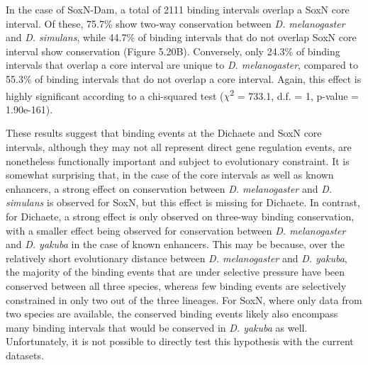 In the case of SoxN-Dam, a total of 2111 binding intervals overlap a SoxN core interval. Of these, 75.7\% show two-way conservation between \emph{D. melanogaster} and \emph{D. simulans}, while 44.7\% of binding intervals that do not overlap SoxN core interval show conservation (Figure 5.20B). Conversely, only 24.3\% of binding intervals that overlap a core interval are unique to \emph{D. melanogaster}, compared to 55.3\% of binding intervals that do not overlap a core interval. Again, this effect is highly significant according to a chi-squared test (\(\chi\)\textsuperscript{2} = 733.1, d.f. = 1, p-value = 1.90e-161).

These results suggest that binding events at the Dichaete and SoxN core intervals, although they may not all represent direct gene regulation events, are nonetheless functionally important and subject to evolutionary constraint. It is somewhat surprising that, in the case of the core intervals as well as known enhancers, a strong effect on conservation between \emph{D. melanogaster} and \emph{D. simulans} is observed for SoxN, but this effect is missing for Dichaete. In contrast, for Dichaete, a strong effect is only observed on three-way binding conservation, with a smaller effect being observed for conservation between \emph{D. melanogaster} and \emph{D. yakuba} in the case of known enhancers. This may be because, over the relatively short evolutionary distance between \emph{D. melanogaster} and \emph{D. yakuba}, the majority of the binding events that are under selective pressure have been conserved between all three species, whereas few binding events are selectively constrained in only two out of the three lineages. For SoxN, where only data from two species are available, the conserved binding events likely also encompass many binding intervals that would be conserved in \emph{D. yakuba} as well. Unfortunately, it is not possible to directly test this hypothesis with the current datasets.

